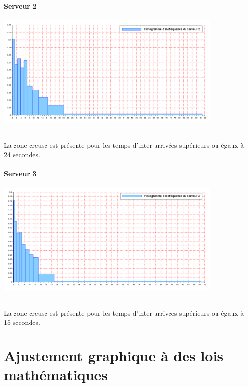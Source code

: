 \documentclass{article}
\begin{document}
\subsection{Serveur 2}
\begin{center}
\includegraphics[width=425px]{img/S2_histo.png}
\end{center}
\paragraph{}
La zone creuse est présente pour les temps d’inter-arrivées supérieurs ou égaux à 24 secondes.

\subsection{Serveur 3}
\begin{center}
\includegraphics[width=425px]{img/S3_histo.png}
\end{center}
\paragraph{}
La zone creuse est présente pour les temps d’inter-arrivées supérieurs ou égaux à 15 secondes.

\part{Ajustement graphique à des lois mathématiques}
\end{document}

